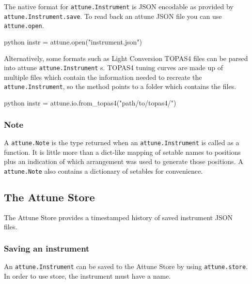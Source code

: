 \hypertarget{loading-from-files}{%
\label{loading-from-files}}

The native format for \texttt{attune.Instrument} is
JSON encodable as provided by
\texttt{attune.Instrument.save}. To read back an attune
JSON file you can use \texttt{attune.open}.

\begin{codefragment}{python}
instr = attune.open("instrument.json")
\end{codefragment}

Alternatively, some formats such as Light Conversion TOPAS4 files can be
parsed into attune \texttt{attune.Instrument} s. TOPAS4
tuning curves are made up of multiple files which contain the
information needed to recreate the
\texttt{attune.Instrument}, so the method points to a
folder which contains the files.

\begin{codefragment}{python}
instr = attune.io.from_topas4("path/to/topas4/")
\end{codefragment}

\hypertarget{note}{%
\subsubsection{Note}\label{note}}

A \texttt{attune.Note} is the type returned when an
\texttt{attune.Instrument} is called as a function. It
is little more than a dict-like mapping of setable names to positions
plus an indication of which arrangement was used to generate those
positions. A \texttt{attune.Note} also contains a
dictionary of setables for convenience.

\hypertarget{store}{%
\subsection{The Attune Store}\label{store}}

The Attune Store provides a timestamped history of saved instrument JSON
files.

\hypertarget{saving-an-instrument}{%
\subsubsection{Saving an instrument}\label{saving-an-instrument}}

An \texttt{attune.Instrument} can be saved to the
Attune Store by using \texttt{attune.store}. In order to use store, the
instrument must have a name.

